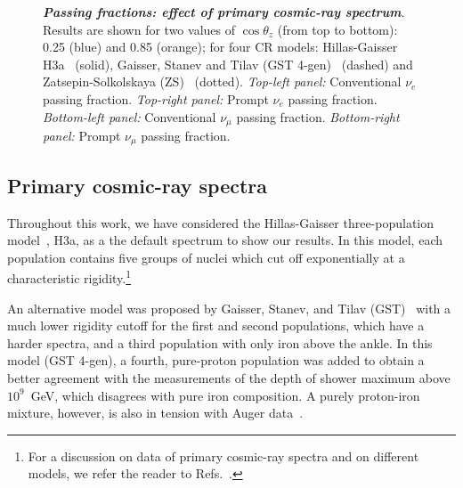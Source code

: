 \documentclass[aps,prd,showpacs,letterpaper,onecolumn,longbibliography,superscriptaddress,notitlepage,nofootinbib]{revtex4-1}%
\begin{document}
\begin{figure}[h!]
{    }
\caption{\textbf{\textit{Passing fractions: effect of primary cosmic-ray spectrum}}. Results are shown for two values of $\cos\theta_z$ (from top to bottom): 0.25 (blue) and 0.85 (orange); for four CR models: Hillas-Gaisser H3a~\cite{Gaisser:2011cc} (solid), Gaisser, Stanev and Tilav (GST 4-gen)~\cite{Gaisser:2013bla} (dashed) and Zatsepin-Solkolskaya (ZS)~\cite{Zatsepin:2006ci} (dotted).
\textit{Top-left panel:} Conventional $\nu_e$ passing fraction. \textit{Top-right panel:} Prompt $\nu_e$ passing fraction. \textit{Bottom-left panel:} Conventional $\nu_\mu$ passing fraction. \textit{Bottom-right panel:} Prompt $\nu_\mu$ passing fraction.}
\label{fig:nue-cr-model-effect} \vspace{1.5cm}
\end{figure}

\subsection{Primary cosmic-ray spectra}
\label{sec:CR}

Throughout this work, we have considered the Hillas-Gaisser three-population model~\cite{Gaisser:2011cc}, H3a, as a the default spectrum to show our results. In this model, each population contains five groups of nuclei which cut off exponentially at a characteristic rigidity.\footnote{For a discussion on data of primary cosmic-ray spectra and on different models, we refer the reader to Refs.~\cite{Fedynitch:2012fs, Dembinski:2017zsh}.}

An alternative model was proposed by Gaisser, Stanev, and Tilav (GST)~\cite{Gaisser:2013bla} with a much lower rigidity cutoff for the first and second populations, which have a harder spectra, and a third population with only iron above the ankle. In this model (GST 4-gen), a fourth, pure-proton population was added to obtain a better agreement with the measurements of the depth of shower maximum above $10^9$~GeV, which disagrees with pure iron composition. A purely proton-iron mixture, however, is also in tension with Auger data~\cite{Abraham:2010yv, Aab:2014aea}.
\end{document}
